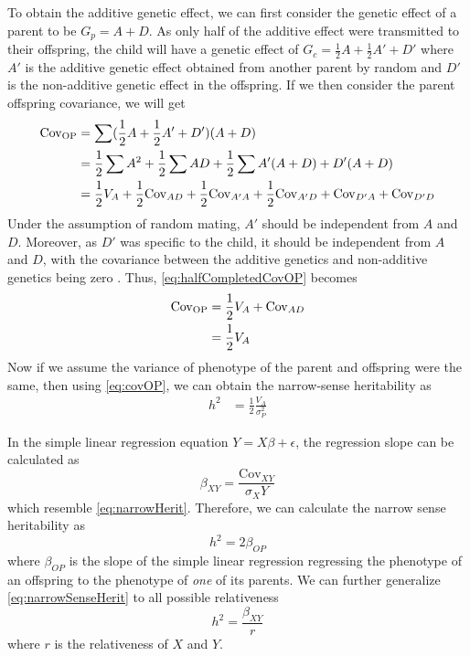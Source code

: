 \documentclass[12pt]{scrbook}
\begin{document}
	To obtain the additive genetic effect, we can first consider the genetic effect of a parent to be $G_p=A+D$. 
	As only half of the additive effect were transmitted to their offspring, the child will have a genetic effect of $G_c=\frac{1}{2}A+\frac{1}{2}A'+D'$ where $A'$ is the additive genetic effect obtained from another parent by random and $D'$ is the non-additive genetic effect in the offspring.
	If we then consider the parent offspring covariance, we will get
	\begin{align}
	\mathrm{Cov_{OP}}&= \sum(\frac{1}{2}A+\frac{1}{2}A'+D')(A+D)\notag\\
	&=\frac{1}{2}\sum A^2+\frac{1}{2}\sum AD + \frac{1}{2}\sum A'(A+D) +D'(A+D) \notag\\ 
	&=\frac{1}{2}V_A+ \frac{1}{2}\mathrm{Cov}_{AD} + \frac{1}{2}\mathrm{Cov}_{A'A} + \frac{1}{2}\mathrm{Cov}_{A'D} +\mathrm{Cov}_{D'A} +\mathrm{Cov}_{D'D}  
	\label{eq:halfCompletedCovOP}
	\end{align} 
	Under the assumption of random mating,  $A'$ should be independent from $A$ and $D$. 
	Moreover, as $D'$ was specific to the child, it should be independent from $A$ and $D$, with the covariance between the additive genetics and non-additive genetics being zero \citep{Falconer1996}.
	Thus, \cref{eq:halfCompletedCovOP} becomes
	\begin{align}
	\mathrm{Cov_{OP}} &= \frac{1}{2}V_A+\mathrm{Cov}_{AD} \notag\\
	&= \frac{1}{2}V_A
	\label{eq:covOP}
	\end{align}
	Now if we assume the variance of phenotype of the parent and offspring were the same, then using \cref{eq:covOP}, we can obtain the narrow-sense heritability as
	\begin{align}
	h^2 &= \frac{1}{2}\frac{V_A}{\sigma_P^2}
	\label{eq:narrowHerit}
	\end{align}
	
	In the simple linear regression equation $Y=X\beta+\epsilon$, the regression slope can be calculated as 
	\begin{equation}
	\beta_{XY} = \frac{\mathrm{Cov}_{XY}}{\sigma_{X}{Y}}
	\end{equation}
	which resemble \cref{eq:narrowHerit}. 
	Therefore,  we can calculate the narrow sense heritability as
	\begin{equation}
	h^2 = 2\beta_{OP}
	\label{eq:narrowSenseHerit}
	\end{equation}
	where $\beta_{OP}$ is the slope of the simple linear regression regressing the phenotype of an offspring to the phenotype of \emph{one} of its parents.
	We can further generalize \cref{eq:narrowSenseHerit} to all possible relativeness 
	\begin{equation}
	h^2=\frac{\beta_{XY}}{r}
	\label{eq:finalNarrow}
	\end{equation}
	where $r$ is the relativeness of $X$ and $Y$.
	
\end{document}
